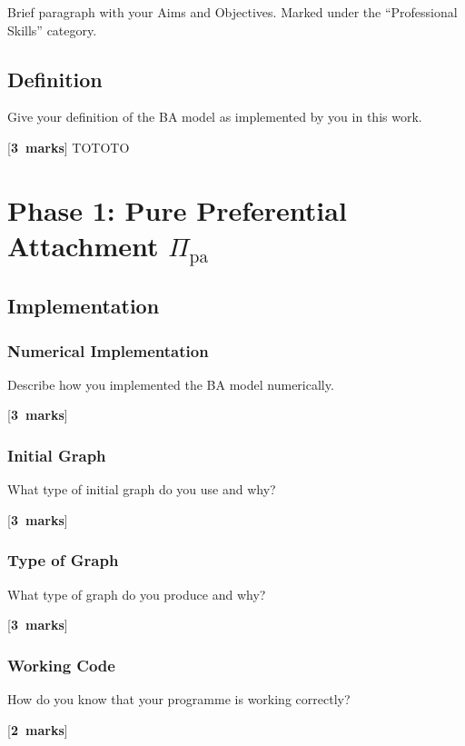 \documentclass[a4paper,12pt]{article}
\newcounter{nmarks}
\newcommand{\qmarks}[1]{\addtocounter{nmarks}{#1} }
\renewcommand{\qmarks}[1]{\addtocounter{nmarks}{#1} \hspace*{\fill} [\textbf{#1~marks}]}
\begin{document}
Brief paragraph with your Aims and Objectives. Marked under the ``Professional Skills'' category.

\subsection*{Definition}

Give your definition of the BA model as implemented by you in this work. \qmarks{3} TOTOTO


\section{Phase 1: Pure Preferential Attachment $\Pi_\mathrm{pa}$}

\subsection{Implementation}



\subsubsection{Numerical Implementation}
Describe how you implemented the BA model numerically. \qmarks{3} %


\subsubsection{Initial Graph}
What type of initial graph do you use and why? \qmarks{3} %

\subsubsection{Type of Graph}
What type of graph do you produce and why? \qmarks{3}

\subsubsection{Working Code}
How do you know that your programme is working correctly? \qmarks{2}
\end{document}
